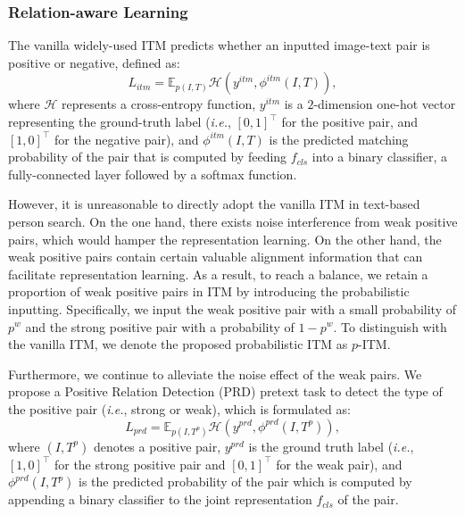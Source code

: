 \documentclass{article}
\begin{document}
\subsubsection{Relation-aware Learning}
The vanilla widely-used ITM predicts whether an inputted image-text pair is positive or negative, defined as:
\begin{equation}
    L_{itm} = \mathbb{E}_{p(I, T)}{\mathcal{H}}(y^{itm}, \phi^{itm}(I, T)), \label{equ1}
\end{equation}
where $\mathcal{H}$ represents a cross-entropy function, $y^{itm}$ is a $2$-dimension one-hot vector representing the ground-truth label (\emph{i.e.}, $\left[0, 1\right]^\top$ for the positive pair, and $\left[1, 0\right]^\top$ for the negative pair), and $\phi^{itm}(I, T)$ is the predicted matching probability of the pair that is computed by feeding $f_{cls}$ into a binary classifier, a fully-connected layer followed by a softmax function.

However, it is unreasonable to directly adopt the vanilla ITM in text-based person search.
On the one hand, there exists noise interference from weak positive pairs, which would hamper the representation learning.
On the other hand, the weak positive pairs contain certain valuable alignment information that can facilitate representation learning.
As a result, to reach a balance, we retain a proportion of weak positive pairs in ITM by introducing the probabilistic inputting.
Specifically, we input the weak positive pair with a small probability of $p^w$ and the strong positive pair with a probability of $1-p^w$.
To distinguish with the vanilla ITM, we denote the proposed probabilistic ITM as $p$-ITM.


Furthermore, we continue to alleviate the noise effect of the weak pairs.
We propose a Positive Relation Detection (PRD) pretext task to detect the type of the positive pair (\emph{i.e.}, strong or weak), which is formulated as:
\begin{equation}
    L_{prd} = \mathbb{E}_{p({I}, {T^p})}{\mathcal{H}}(y^{prd}, \phi^{prd}({I}, {T^p})), \label{equ2}
\end{equation}
where $({I}, {T^p})$ denotes a positive pair, $y^{prd}$ is the ground truth label (\emph{i.e.}, $\left[1, 0\right]^\top$ for the strong positive pair and $\left[0, 1\right]^\top$ for the weak pair), and $\phi^{prd}({I}, {T^p})$ is the predicted probability of the pair which is computed by appending a binary classifier to the joint representation $f_{cls}$ of the pair.
\end{document}
